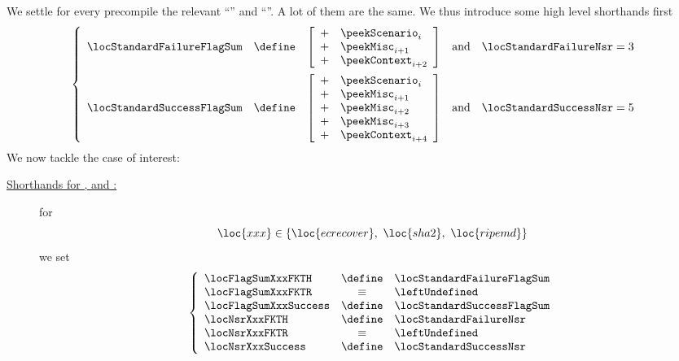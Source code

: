 We settle for every precompile the relevant ``'' and ``''. 
A lot of them are the same. We thus introduce some high level shorthands first
\[
	\left\{ \begin{array}{lclcr}
		\locStandardFailureFlagSum & \define & 
		\left[ \begin{array}{cl}
			+ & \peekScenario  _{i    } \\ 
			+ & \peekMisc      _{i + 1} \\ 
			+ & \peekContext   _{i + 2} \\ 
		\end{array} \right] & \text{and} & \locStandardFailureNsr = 3
		\vspace{2mm} \\
		\locStandardSuccessFlagSum & \define & 
		\left[ \begin{array}{cl}
			+ & \peekScenario  _{i    } \\ 
			+ & \peekMisc      _{i + 1} \\ 
			+ & \peekMisc      _{i + 2} \\ 
			+ & \peekMisc      _{i + 3} \\ 
			+ & \peekContext   _{i + 4} \\ 
		\end{array} \right] & \text{and} & \locStandardSuccessNsr = 5 \\
	\end{array} \right.
\]
We now tackle the case of interest: 
\begin{description}
	\item[\underline{\underline{Shorthands for \instEcrecover{}, \instShaTwo{} and \instRipemd{}:}}]
		for
		\[
			\loc{xxx} \in \left\{ \loc{ecrecover}, ~ \loc{sha2}, ~ \loc{ripemd} \right\}
		\]
		we set
		\[
			\left\{ \begin{array}{lcl}
				\locFlagSumXxxFKTH    & \define & \locStandardFailureFlagSum \\
				\locFlagSumXxxFKTR    & \equiv  & \leftUndefined             \\
				\locFlagSumXxxSuccess & \define & \locStandardSuccessFlagSum \\
				\locNsrXxxFKTH        & \define & \locStandardFailureNsr     \\
				\locNsrXxxFKTR        & \equiv  & \leftUndefined             \\
				\locNsrXxxSuccess     & \define & \locStandardSuccessNsr     \\
			\end{array} \right.
		\]
\end{description}
